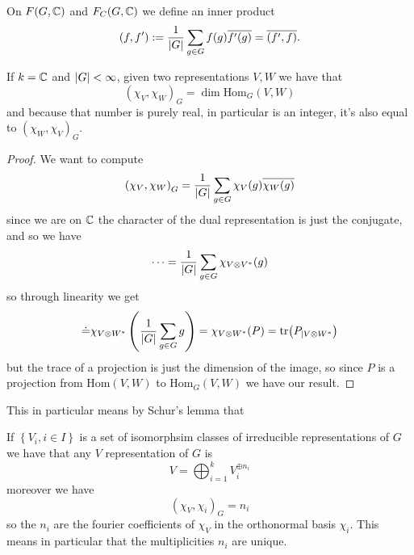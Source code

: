 \documentclass[11pt]{scrartcl}
\newcommand{\tr}[1]{\text{tr}\!\left(#1\right)}
\begin{document}
	\begin{definition}
		On $F(G,\mathbb C)$ and $F_C(G,\mathbb C)$ we define an inner product
		$$\left(f,f'\right):=\frac{1}{\left\lvert G \right\rvert}\sum_{g\in G} f(g)\overline{f'(g)}=\overline{\left(f',f\right)}.$$
	\end{definition}
	\begin{proposition}
		\label{First orthogonality relations}
		If $k=\mathbb C$ and $\left\lvert G \right\rvert<\infty$, given two representations $V,W$ we have that
		$$\left(\chi_V,\chi_W\right)_G=\dim\text{Hom}_G(V,W)$$
		and because that number is purely real, in particular is an integer, it's also equal to $\left(\chi_W,\chi_V\right)_G$.
	\end{proposition}
	\begin{proof}
		We want to compute 
		$$\left(\chi_V,\chi_W\right)_G=\frac{1}{\left\lvert G \right\rvert}\sum_{g\in G}\chi_V(g)\overline{\chi_W(g)}$$
		since we are on $\mathbb C$ the character of the dual representation is just the conjugate, and so we have
		$$\dots=\frac{1}{\left\lvert G \right\rvert}\sum_{g\in G}\chi_{V\otimes V^*}(g)$$
		so through linearity we get
		$$\dot= \chi_{V\otimes W^*}\left(\frac{1}{\abs{G}}\sum_{g\in G}g\right)=\chi_{V\otimes W^*}(P)=\tr{P_{\mid V\otimes W^*}}$$
		but the trace of a projection is just the dimension of the image, so since $P$ is a projection from $\text{Hom}(V,W)$ to $\text{Hom}_G(V,W)$ we have our result. 
	\end{proof}
	This in particular means by Schur's lemma that 
	\begin{corollary}
		If $\left\{V_i,i\in I\right\}$ is a set of isomorphsim classes of irreducible representations of $G$ we have that any $V$ representation of $G$ is
		$$V=\bigoplus_{i=1}^k V_i^{\oplus n_i}$$
		moreover we have 
		$$\left(\chi_V,\chi_i\right)_G=n_i$$
		so the $n_i$ are the fourier coefficients of $\chi_V$ in the orthonormal basis $\chi_i$. This means in particular that the multiplicities $n_i$ are unique.
	\end{corollary}
	
\end{document}

